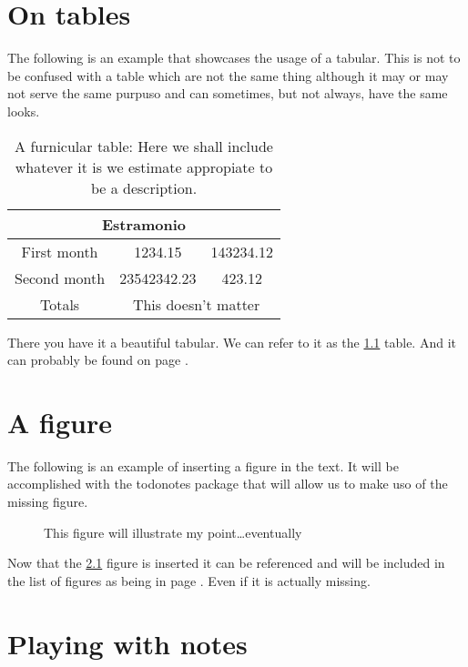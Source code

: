 \chapter{On tables}
The following is an example that showcases the usage of a tabular.
This is not to be confused with a table which are not the same thing although it may or may not serve the same purpuso and can sometimes, but not always, have the same looks.

\begin{table}[h]
	\centering
\begin{tabular}{ccc}
	\hline
	            \multicolumn{3}{c}{Estramonio}             \\ \hline
	First month  &   1234.15   &         143234.12         \\
	Second month & 23542342.23 &          423.12           \\ \hline
	   Totals    & \multicolumn{2}{c}{This doesn't matter} \\ \hline
\end{tabular}
	\caption[A first table]{A furnicular table: Here we shall include whatever it is we estimate appropiate to be a description.}
	\label{tab:first}
\end{table}

There you have it a beautiful tabular. We can refer to it as the \ref{tab:first} table. And it can probably be found on page \pageref{tab:first}.

\lipsum

\chapter{A figure}

The following is an example of inserting a figure in the text. It will be accomplished with the todonotes  package that will allow us to make uso of the missing figure.

\begin{figure}[h]
	\centering
	\caption[A missing figure]{This figure will illustrate my point…eventually}
	\label{fig:miss}
\end{figure}

Now that the \ref{fig:miss} figure is inserted it can be referenced and will be included in the list of figures as being in page \pageref{fig:miss}. Even if it is actually missing.

\lipsum

\chapter{Playing with notes}

